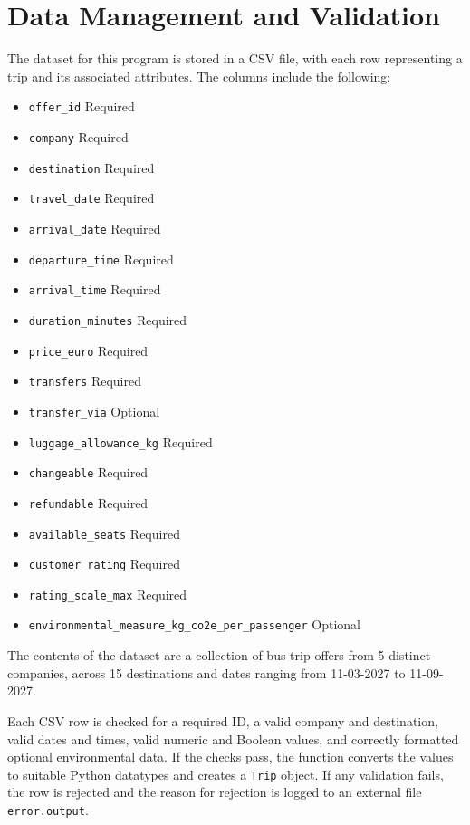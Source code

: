 ﻿\documentclass[11pt]{article}
\begin{document}
\section{Data Management and Validation}
The dataset for this program is stored in a CSV file, with each row representing a trip and its associated attributes.
The columns include the following:
\begin{itemize}[nosep]
\item \texttt{offer\_id} Required
\item \texttt{company} Required
\item \texttt{destination} Required
\item \texttt{travel\_date} Required
\item \texttt{arrival\_date} Required
\item \texttt{departure\_time} Required
\item \texttt{arrival\_time} Required
\item \texttt{duration\_minutes} Required
\item \texttt{price\_euro} Required
\item \texttt{transfers} Required
\item \texttt{transfer\_via} Optional
\item \texttt{luggage\_allowance\_kg} Required
\item \texttt{changeable} Required
\item \texttt{refundable} Required
\item \texttt{available\_seats} Required
\item \texttt{customer\_rating} Required
\item \texttt{rating\_scale\_max} Required
\item \texttt{environmental\_measure\_kg\_co2e\_per\_passenger} Optional
\end{itemize}

The contents of the dataset are a collection of bus trip offers from 5 distinct companies, 
across 15 destinations and dates ranging from 11-03-2027 to 11-09-2027.

Each CSV row is checked for a required ID, a valid company and destination, valid dates and times, valid numeric and Boolean values, and correctly formatted optional environmental data.
If the checks pass, the function converts the values to suitable Python datatypes and creates a \texttt{Trip} object. 
If any validation fails, the row is rejected and the reason for rejection is logged to an external file \texttt{error.output}.
\end{document}
